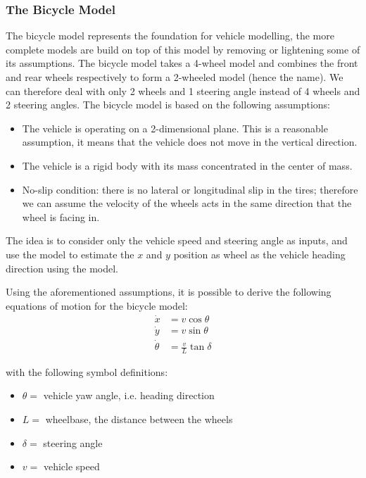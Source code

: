 \documentclass[a4paper,12pt,sort&compress]{article}
\begin{document}
    \subsubsection*{The Bicycle Model}
    The bicycle model represents the foundation for vehicle modelling,
    the more complete models are build on top of this model by removing or
    lightening some of its assumptions. 
    The bicycle model takes a 4-wheel model and combines the front and rear
    wheels respectively to form a 2-wheeled model (hence the name). We can
    therefore deal with only 2 wheels and 1 steering angle instead of 4 wheels
    and 2 steering angles. 
    The bicycle model is based on the following assumptions:
    \begin{itemize}
        \item The vehicle is operating on a 2-dimensional plane. This is a reasonable assumption, it means that the vehicle
        does not move in the vertical direction.
        \item The vehicle is a rigid body with its mass concentrated in the center of mass.
        \item No-slip condition: there is no lateral or longitudinal slip in the
        tires; therefore we can assume the velocity of the wheels acts in the same
        direction that the wheel is facing in. 
    \end{itemize}

    The idea is to consider only the vehicle speed and steering angle as inputs,
    and use the model to estimate the $x$ and $y$ position as wheel as the vehicle
    heading direction using the model.

    Using the aforementioned assumptions, it is possible to derive the following
    equations of motion for the bicycle model:
    \begin{align} 
        \dot{x} &= v \cos \theta \\
        \dot{y} &= v \sin \theta \\
        \dot{\theta} &= \frac{v}{L} \tan \delta
    \end{align}

    with the following symbol definitions:
    \begin{itemize} 
        \item $\theta =$ vehicle yaw angle, i.e. heading direction
        \item $L =$ wheelbase, the distance between the wheels
        \item $\delta =$ steering angle
        \item $v =$ vehicle speed
    \end{itemize}
\end{document}
